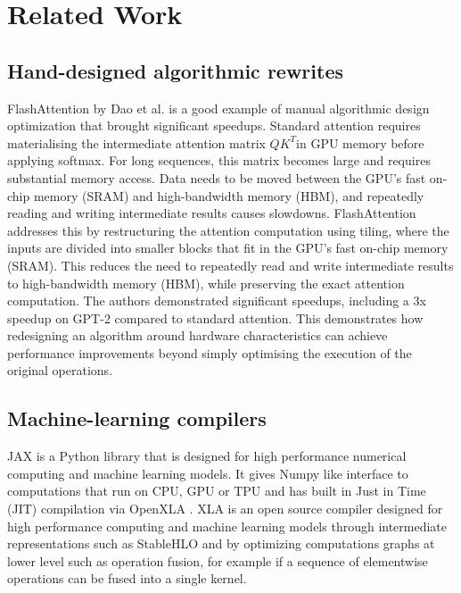 \documentclass[conference]{IEEEtran}
\begin{document}
\section{Related Work}
\subsection{Hand-designed algorithmic rewrites}
FlashAttention by Dao et al. \cite{dao2022flashattention} is a good example of manual algorithmic design optimization that brought significant speedups. Standard attention requires materialising the intermediate attention matrix $QK^T$in GPU memory before applying softmax. For long sequences, this matrix becomes large and requires substantial memory access. Data needs to be moved between the GPU's fast on-chip memory (SRAM) and high-bandwidth memory (HBM), and repeatedly reading and writing intermediate results causes slowdowns. FlashAttention addresses this by restructuring the attention computation using tiling, where the inputs are divided into smaller blocks that fit in the GPU's fast on-chip memory (SRAM). This reduces the need to repeatedly read and write intermediate results to high-bandwidth memory (HBM), while preserving the exact attention computation. The authors demonstrated significant speedups, including a 3x speedup on GPT-2 compared to standard attention. This demonstrates how redesigning an algorithm around hardware characteristics can achieve performance improvements beyond simply optimising the execution of the original operations.

\subsection{Machine-learning compilers}
JAX \cite{jax} is a Python library that is designed for high performance numerical computing and machine learning models. It gives Numpy like interface to computations that run on CPU, GPU or TPU and has built in Just in Time (JIT) compilation via OpenXLA \cite{openxla}. XLA is an open source compiler designed for high performance computing and machine learning models through intermediate representations such as StableHLO and by optimizing computations graphs at lower level such as operation fusion, for example if a sequence of elementwise operations can be fused into a single kernel.
\end{document}
